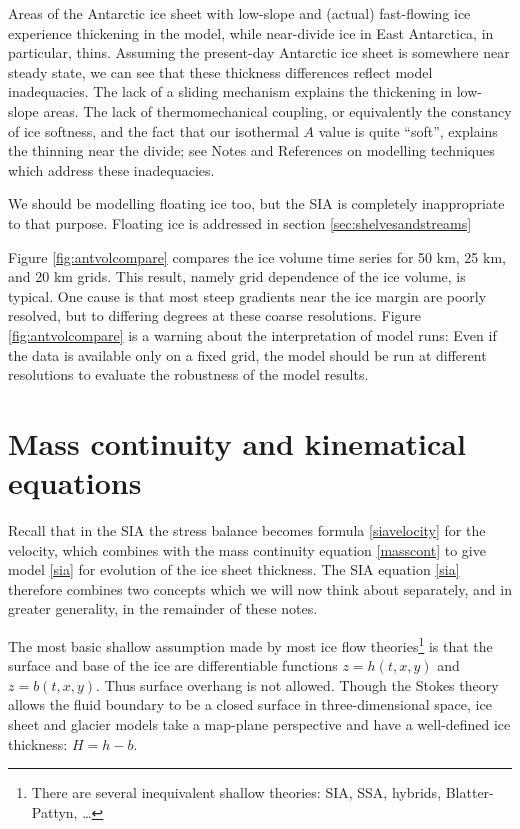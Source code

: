 \documentclass[letterpaper,final,12pt,reqno]{amsart}
\begin{document}
Areas of the Antarctic ice sheet with low-slope and (actual) fast-flowing ice experience thickening in the model, while near-divide ice in East Antarctica, in particular, thins.  Assuming the present-day Antarctic ice sheet is somewhere near steady state, we can see that these thickness differences reflect model inadequacies.  The lack of a sliding mechanism explains the thickening in low-slope areas.  The lack of thermomechanical coupling, or equivalently the constancy of ice softness, and the fact that our isothermal $A$ value is quite ``soft'', explains the thinning near the divide; see Notes and References on modelling techniques which address these inadequacies.

We should be modelling floating ice too, but the SIA is completely inappropriate to that purpose.  Floating ice is addressed in section \ref{sec:shelvesandstreams}

Figure \ref{fig:antvolcompare} compares the ice volume time series for 50 km, 25 km, and 20 km grids.  This result, namely grid dependence of the ice volume, is typical.  One cause is that most steep gradients near the ice margin are poorly resolved, but to differing degrees at these coarse resolutions.  Figure \ref{fig:antvolcompare} is a warning about the interpretation of model runs:  Even if the data is available only on a fixed grid, the model should be run at different resolutions to evaluate the robustness of the model results.


\section{Mass continuity and kinematical equations}   \label{sec:masscont}

Recall that in the SIA the stress balance becomes formula \eqref{siavelocity} for the velocity, which combines with the mass continuity equation \eqref{masscont} to give model \eqref{sia} for evolution of the ice sheet thickness.  The SIA equation \eqref{sia} therefore combines two concepts which we will now think about separately, and in greater generality, in the remainder of these notes.

The most basic shallow assumption made by most ice flow theories\footnote{There are several inequivalent shallow theories: SIA, SSA, hybrids, Blatter-Pattyn, \dots} is that the surface and base of the ice are differentiable functions $z=h(t,x,y)$ and $z=b(t,x,y)$.  Thus surface overhang is not allowed.  Though the Stokes theory allows the fluid boundary to be a closed surface in three-dimensional space, ice sheet and glacier models take a map-plane perspective and have a well-defined ice thickness: $H=h-b$.
\end{document}
